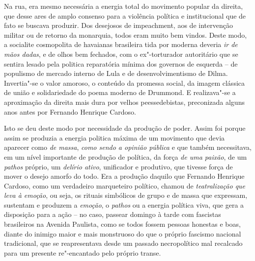 Na rua, era mesmo necessária a energia total do movimento popular da
direita, que desse ares de amplo consenso para a violência política e
institucional que de fato se buscava produzir. Dos desejosos de
impeachment, aos de intervenção militar ou de retorno da monarquia,
todos eram muito bem vindos. Deste modo, a socialite cosmopolita de
havaianas brasileira tida por moderna deveria \emph{ir de mãos dadas}, e
de olhos bem fechados, com o ex"-torturador autoritário que se sentira
lesado pela politica reparatória mínima dos governos de esquerda -- de
populismo de mercado interno de Lula e de desenvolvimentismo de Dilma.
Invertia"-se o valor amoroso, o conteúdo da promessa social, da imagem
clássica de união e solidariedade do poema moderno de Drummond. E
realizava"-se a aproximação da direita mais dura por velhos
peessedebistas, preconizada alguns anos antes por Fernando Henrique
Cardoso.

Isto se deu deste modo por necessidade da produção de poder. Assim foi
porque assim se produzia a energia politica máxima de um movimento que
devia aparecer como \emph{de massa}, \emph{como sendo a opinião pública}
e que também necessitava, em um nível importante de produção de
política, da força \emph{de uma paixão}, de um \emph{pathos} próprio, um
\emph{delírio ativo}, unificador e produtivo, que tivesse força de mover
o desejo amorfo do todo. Era a produção daquilo que Fernando Henrique
Cardoso, como um verdadeiro marqueteiro político, chamou de
\emph{teatralização que leva à emoção}, ou seja, os rituais simbólicos
de grupo e de massa que expressam, sustentam e produzem a \emph{emoção},
o \emph{pathos} ou a energia política viva, que gera a disposição para a
ação -- no caso, passear domingo à tarde com fascistas brasileiros na
Avenida Paulista, como se todos fossem pessoas honestas e boas, diante
do inimigo maior e mais monstruoso do que o próprio fascismo nacional
tradicional, que se reapresentava desde um passado necropolítico mal
recalcado para um presente re"-encantado pelo próprio transe.

